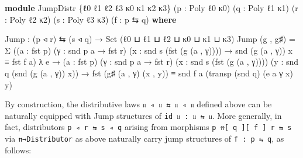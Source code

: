 \documentclass[
  11pt,
  oneside,
  article]{memoir}
\newenvironment{Shaded}{}{}
\newcommand{\DataTypeTok}[1]{\textcolor[rgb]{0.56,0.13,0.00}{#1}}
\newcommand{\KeywordTok}[1]{\textcolor[rgb]{0.00,0.44,0.13}{\textbf{#1}}}
\newcommand{\NormalTok}[1]{#1}
\newcommand{\OtherTok}[1]{\textcolor[rgb]{0.00,0.44,0.13}{#1}}
\theoremstyle{definition}
\theoremstyle{plain}
\newcommand{\0}{\textsf{0}}
\newcommand{\1}{\tn{\textsf{1}}}
\begin{document}
\begin{Shaded}
\begin{Highlighting}[]
\KeywordTok{module}\NormalTok{ JumpDistr }\OtherTok{\{}\NormalTok{ℓ0 ℓ1 ℓ2 ℓ3 κ0 κ1 κ2 κ3}\OtherTok{\}}
       \OtherTok{(}\NormalTok{p }\OtherTok{:}\NormalTok{ Poly ℓ0 κ0}\OtherTok{)} \OtherTok{(}\NormalTok{q }\OtherTok{:}\NormalTok{ Poly ℓ1 κ1}\OtherTok{)}
       \OtherTok{(}\NormalTok{r }\OtherTok{:}\NormalTok{ Poly ℓ2 κ2}\OtherTok{)} \OtherTok{(}\NormalTok{s }\OtherTok{:}\NormalTok{ Poly ℓ3 κ3}\OtherTok{)}
       \OtherTok{(}\NormalTok{f }\OtherTok{:}\NormalTok{ p ⇆ q}\OtherTok{)} \KeywordTok{where}

\NormalTok{    Jump }\OtherTok{:} \OtherTok{(}\NormalTok{p ◃ r}\OtherTok{)}\NormalTok{ ⇆ }\OtherTok{(}\NormalTok{s ◃ q}\OtherTok{)} \OtherTok{→} \DataTypeTok{Set} \OtherTok{(}\NormalTok{ℓ0 ⊔ ℓ1 ⊔ ℓ2 ⊔ κ0 ⊔ κ1 ⊔ κ3}\OtherTok{)}
\NormalTok{    Jump }\OtherTok{(}\NormalTok{g , g♯}\OtherTok{)} \OtherTok{=}
\NormalTok{        Σ }\OtherTok{((}\NormalTok{a }\OtherTok{:}\NormalTok{ fst p}\OtherTok{)} \OtherTok{(}\NormalTok{γ }\OtherTok{:}\NormalTok{ snd p a }\OtherTok{→}\NormalTok{ fst r}\OtherTok{)} 
           \OtherTok{(}\NormalTok{x }\OtherTok{:}\NormalTok{ snd s }\OtherTok{(}\NormalTok{fst }\OtherTok{(}\NormalTok{g }\OtherTok{(}\NormalTok{a , γ}\OtherTok{))))} 
            \OtherTok{→}\NormalTok{ snd }\OtherTok{(}\NormalTok{g }\OtherTok{(}\NormalTok{a , γ}\OtherTok{))}\NormalTok{ x ≡ fst f a}\OtherTok{)} 
           \OtherTok{λ}\NormalTok{ e }\OtherTok{→} \OtherTok{(}\NormalTok{a }\OtherTok{:}\NormalTok{ fst p}\OtherTok{)} \OtherTok{(}\NormalTok{γ }\OtherTok{:}\NormalTok{ snd p a }\OtherTok{→}\NormalTok{ fst r}\OtherTok{)} 
                 \OtherTok{(}\NormalTok{x }\OtherTok{:}\NormalTok{ snd s }\OtherTok{(}\NormalTok{fst }\OtherTok{(}\NormalTok{g }\OtherTok{(}\NormalTok{a , γ}\OtherTok{))))}
                 \OtherTok{(}\NormalTok{y }\OtherTok{:}\NormalTok{ snd q }\OtherTok{(}\NormalTok{snd }\OtherTok{(}\NormalTok{g }\OtherTok{(}\NormalTok{a , γ}\OtherTok{))}\NormalTok{ x}\OtherTok{))}
                 \OtherTok{→}\NormalTok{ fst }\OtherTok{(}\NormalTok{g♯ }\OtherTok{(}\NormalTok{a , γ}\OtherTok{)} \OtherTok{(}\NormalTok{x , y}\OtherTok{))}
\NormalTok{                   ≡ snd f a }\OtherTok{(}\NormalTok{transp }\OtherTok{(}\NormalTok{snd q}\OtherTok{)} \OtherTok{(}\NormalTok{e a γ x}\OtherTok{)}\NormalTok{ y}\OtherTok{)}
\end{Highlighting}
\end{Shaded}

By construction, the distributive laws \texttt{𝔲\ ◃\ 𝔲\ ⇆\ 𝔲\ ◃\ 𝔲}
defined above can be naturally equipped with Jump structures of
\texttt{id\ 𝔲\ :\ 𝔲\ ⇆\ 𝔲}. More generally, in fact, distributors
\texttt{p\ ◃\ r\ ⇆\ s\ ◃\ q} arising from morphisms
\texttt{p\ ⇈{[}\ q\ {]}{[}\ f\ {]}\ r\ ⇆\ s} via \texttt{⇈→Distributor}
as above naturally carry jump structures of \texttt{f\ :\ p\ ⇆\ q}, as
follows:
\end{document}
